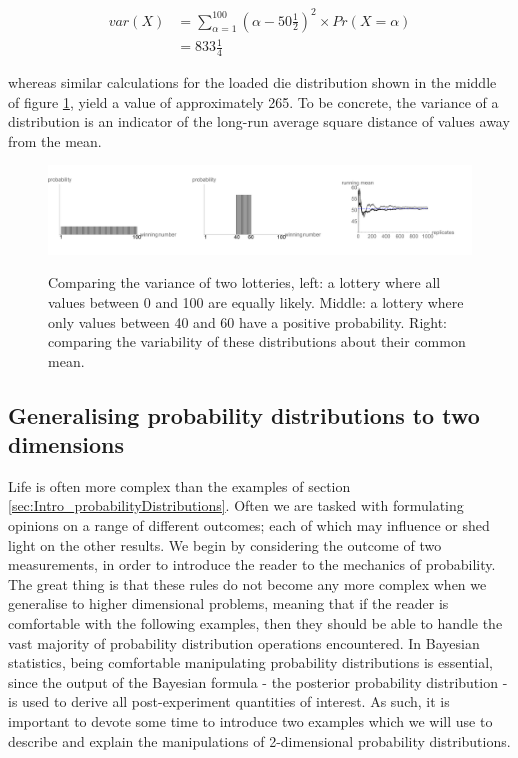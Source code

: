 \documentclass[11pt,fullpage]{book}
\begin{document}
\begin{equation}
\begin{align}
var(X) &= \sum\limits_{\alpha=1}^{100} (\alpha-50\tfrac{1}{2})^2\times Pr(X=\alpha)\\
&= 833\tfrac{1}{4}
\end{align}
\end{equation}

whereas similar calculations for the loaded die distribution shown in the middle of figure \ref{fig:Intro_varianceLottery}, yield a value of approximately 265. To be concrete, the variance of a distribution is an indicator of the long-run average square distance of values away from the mean. 

\begin{figure}
\centering
\scalebox{0.35} 
{\includegraphics{Intro_varianceLottery.pdf}}
\caption{Comparing the variance of two lotteries, left: a lottery where all values between 0 and 100 are equally likely. Middle: a lottery where only values between 40 and 60 have a positive probability. Right: comparing the variability of these distributions about their common mean.}\label{fig:Intro_varianceLottery}
\end{figure} 

\subsection{Generalising probability distributions to two dimensions}
Life is often more complex than the examples of section \ref{sec:Intro_probabilityDistributions}. Often we are tasked with formulating opinions on a range of different outcomes; each of which may influence or shed light on the other results. We begin by considering the outcome of two measurements, in order to introduce the reader to the mechanics of probability. The great thing is that these rules do not become any more complex when we generalise to higher dimensional problems, meaning that if the reader is comfortable with the following examples, then they should be able to handle the vast majority of probability distribution operations encountered. In Bayesian statistics, being comfortable manipulating probability distributions is essential, since the output of the Bayesian formula - the posterior probability distribution - is used to derive all post-experiment quantities of interest. As such, it is important to devote some time to introduce two examples which we will use to describe and explain the manipulations of 2-dimensional probability distributions.
\end{document}
